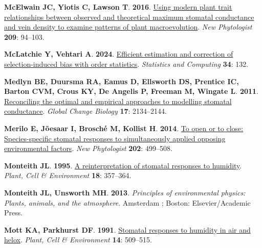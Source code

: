\documentclass[
  letterpaper,
  DIV=11,
  numbers=noendperiod]{scrartcl}
\newlength{\cslhangindent}
\newenvironment{CSLReferences}[2] %
 {\begin{list}{}{%
  \setlength{\itemindent}{0pt}
  \setlength{\leftmargin}{0pt}
  \setlength{\parsep}{0pt}
  \ifodd #1
   \setlength{\leftmargin}{\cslhangindent}
   \setlength{\itemindent}{-1\cslhangindent}
  \fi
  \setlength{\itemsep}{#2\baselineskip}}}
 {\end{list}}
\begin{document}
\begin{CSLReferences}{0}{1}
\textbf{\textbf{McElwain JC}, \textbf{Yiotis C}, \textbf{Lawson T}}.
\textbf{2016}. \href{https://doi.org/10.1111/nph.13579}{Using modern
plant trait relationships between observed and theoretical maximum
stomatal conductance and vein density to examine patterns of plant
macroevolution}. \emph{New Phytologist} \textbf{209}: 94--103.

\textbf{\textbf{McLatchie Y}, \textbf{Vehtari A}}. \textbf{2024}.
\href{https://doi.org/10.1007/s11222-024-10442-4}{Efficient estimation
and correction of selection-induced bias with order statistics}.
\emph{Statistics and Computing} \textbf{34}: 132.

\textbf{\textbf{Medlyn BE}, \textbf{Duursma RA}, \textbf{Eamus D},
\textbf{Ellsworth DS}, \textbf{Prentice IC}, \textbf{Barton CVM},
\textbf{Crous KY}, \textbf{De Angelis P}, \textbf{Freeman M},
\textbf{Wingate L}}. \textbf{2011}.
\href{https://doi.org/10.1111/j.1365-2486.2010.02375.x}{Reconciling the
optimal and empirical approaches to modelling stomatal conductance}.
\emph{Global Change Biology} \textbf{17}: 2134--2144.

\textbf{\textbf{Merilo E}, \textbf{Jõesaar I}, \textbf{Brosché M},
\textbf{Kollist H}}. \textbf{2014}.
\href{https://doi.org/10.1111/nph.12667}{To open or to close:
Species-specific stomatal responses to simultaneously applied opposing
environmental factors}. \emph{New Phytologist} \textbf{202}: 499--508.

\textbf{\textbf{Monteith JL}}. \textbf{1995}.
\href{https://doi.org/10.1111/j.1365-3040.1995.tb00371.x}{A
reinterpretation of stomatal responses to humidity}. \emph{Plant, Cell
\& Environment} \textbf{18}: 357--364.

\textbf{\textbf{Monteith JL}, \textbf{Unsworth MH}}. \textbf{2013}.
\emph{Principles of environmental physics: Plants, animals, and the
atmosphere}. Amsterdam ; Boston: Elsevier/Academic Press.

\textbf{\textbf{Mott KA}, \textbf{Parkhurst DF}}. \textbf{1991}.
\href{https://doi.org/10.1111/j.1365-3040.1991.tb01521.x}{Stomatal
responses to humidity in air and helox}. \emph{Plant, Cell \&
Environment} \textbf{14}: 509--515.


\end{CSLReferences}
\end{document}
